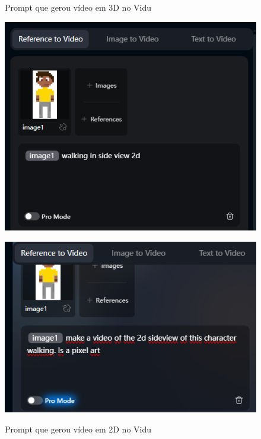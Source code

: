 \begin{figure}[htbp]
    \centering
    \begin{minipage}{0.45\textwidth}
    \centering
    \caption{\small Prompt que gerou vídeo em 3D no Vidu}
    \includegraphics[width=0.9\linewidth]{figs/vidu/prompt2.PNG}
    \label{fig:viduPrompt3d}
    \end{minipage}\hfill
    \begin{minipage}{0.45\textwidth}
    \centering
    \caption{\small Prompt que gerou vídeo em 2D no Vidu}    \includegraphics[width=0.9\linewidth]{figs/vidu/prompt3.PNG}
    \label{fig:viduPrompt2D}
    \end{minipage}\hfill
    
\end{figure}

